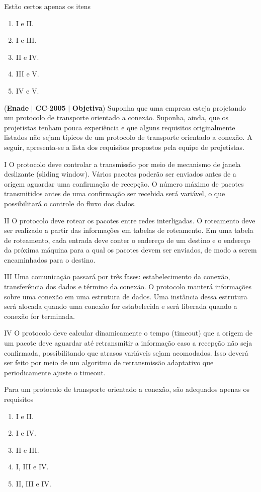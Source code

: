 \documentclass{exam}
\begin{document}
\begin{questions}
Estão certos apenas os itens
	\begin{enumerate}[label=\alph*)]
		\item  I e II. 
		\item  I e III. 
		\item  II e IV.
		\item  III e V.
		\item  IV e V.
	\end{enumerate}

\question (\textbf{Enade} $|$ \textbf{CC}-\textbf{2005} $|$ \textbf{Objetiva})
Suponha que uma empresa esteja projetando um protocolo de
transporte orientado a conexão. Suponha, ainda, que os projetistas
tenham pouca experiência e que alguns requisitos originalmente
listados não sejam típicos de um protocolo de transporte
orientado a conexão. A seguir, apresenta-se a lista dos
requisitos propostos pela equipe de projetistas.

I O protocolo deve controlar a transmissão por meio de
mecanismo de janela deslizante (sliding window). Vários
pacotes poderão ser enviados antes de a origem aguardar uma
confirmação de recepção. O número máximo de pacotes
transmitidos antes de uma confirmação ser recebida será
variável, o que possibilitará o controle do fluxo dos dados.

II O protocolo deve rotear os pacotes entre redes interligadas.
O roteamento deve ser realizado a partir das informações em
tabelas de roteamento. Em uma tabela de roteamento, cada
entrada deve conter o endereço de um destino e o endereço da
próxima máquina para a qual os pacotes devem ser enviados,
de modo a serem encaminhados para o destino.

III Uma comunicação passará por três fases: estabelecimento da
conexão, transferência dos dados e término da conexão. O
protocolo manterá informações sobre uma conexão em uma
estrutura de dados. Uma instância dessa estrutura será alocada
quando uma conexão for estabelecida e será liberada quando
a conexão for terminada.

IV O protocolo deve calcular dinamicamente o tempo (timeout)
que a origem de um pacote deve aguardar até retransmitir a
informação caso a recepção não seja confirmada,
possibilitando que atrasos variáveis sejam acomodados. Isso
deverá ser feito por meio de um algoritmo de retransmissão
adaptativo que periodicamente ajuste o timeout.

Para um protocolo de transporte orientado a conexão, são
adequados apenas os requisitos
	\begin{enumerate}[label=\alph*)]
		\item  I e II.
		\item  I e IV.
		\item  II e III.
		\item  I, III e IV.
		\item  II, III e IV.
	\end{enumerate}


\end{questions}
\end{document}
